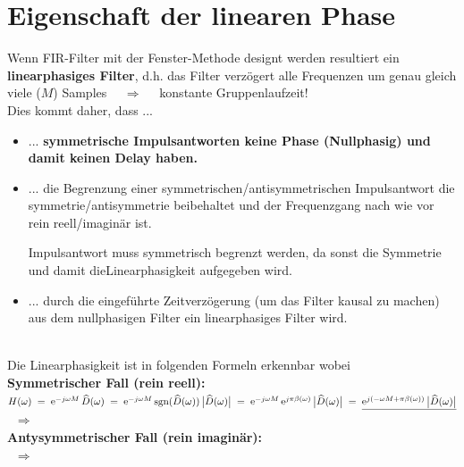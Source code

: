 	\section{Eigenschaft der linearen Phase}
		Wenn FIR-Filter mit der Fenster-Methode designt werden resultiert ein \textbf{linearphasiges Filter}, d.h. das Filter verzögert alle Frequenzen um genau gleich viele ($M$) Samples $\quad\Rightarrow\quad$ konstante Gruppenlaufzeit!\\[0.2cm]
		Dies kommt daher, dass ...
		\begin{itemize}
		 \item ... \textbf{symmetrische Impulsantworten keine Phase (Nullphasig) und damit keinen Delay haben.}
		 \item ... die Begrenzung einer symmetrischen/antisymmetrischen Impulsantwort die symmetrie/antisymmetrie beibehaltet und der Frequenzgang nach wie vor rein reell/imaginär ist. \\
		 \begin{danger}
		  Impulsantwort muss symmetrisch begrenzt werden, da sonst die Symmetrie und damit die\newline Linearphasigkeit aufgegeben wird.
		 \end{danger}
		 \item ... durch die eingeführte Zeitverzögerung (um das Filter kausal zu machen) aus dem nullphasigen Filter ein linearphasiges Filter wird.
		\end{itemize}$ $\\[-0.7cm]
		Die Linearphasigkeit ist in folgenden Formeln erkennbar wobei $\quad$\normalsize\\[-0.2cm]
		\textbf{Symmetrischer Fall (rein reell):}\\[0.2cm]
		$H(\omega)\; =\; \mathrm{e}^{-j\omega M} \,\widehat D(\omega) 
		\; =\; \mathrm{e}^{-j\omega M}\,\text{sgn}(\widehat D(\omega))\, \big|\widehat D(\omega) \big|
		\; =\; \mathrm{e}^{-j\omega M}\,\mathrm{e}^{j\pi\beta(\omega)} \,\big|\widehat D(\omega) \big|\; =\; \underline{\mathrm{e}^{j(-\omega M+\pi\beta(\omega))}\,\big|\widehat D(\omega) \big|}$\\[0.2cm]
		$\;\;\Rightarrow\qquad$\\[0.2cm]
		\textbf{Antysymmetrischer Fall (rein imaginär):}\\[0.2cm]
		$\;\;\Rightarrow\qquad$
	
